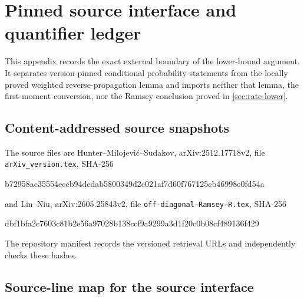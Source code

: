 \section{Pinned source interface and quantifier ledger}\label{app:bridge}

This appendix records the exact external boundary of the lower-bound
argument.  It separates version-pinned conditional probability statements
from the locally proved weighted reverse-propagation lemma and imports neither
that lemma, the first-moment conversion, nor the Ramsey conclusion proved in
\cref{sec:rate-lower}.

\subsection{Content-addressed source snapshots}

The source files are Hunter--Milojevi\'c--Sudakov,
arXiv:2512.17718v2, file \texttt{arXiv\_version.tex}, SHA-256
\begin{center}
\small\ttfamily
b72958ac35554eccb94dedab5800349d2c021af7d60f767125cb46998e0fd54a
\end{center}
and Lin--Niu, arXiv:2605.25843v2, file
\texttt{off-diagonal-Ramsey-R.tex}, SHA-256
\begin{center}
\small\ttfamily
dbf1bfa2c7603c81b2e56a97028b138ccf9a9299a3d1f20c0b08cf489136f429
\end{center}
The repository manifest records the versioned retrieval URLs and independently
checks these hashes.

\subsection{Source-line map for the source interface}

